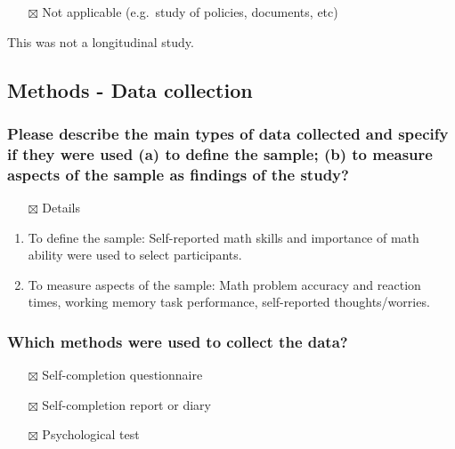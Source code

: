 \documentclass[
  doc, a4paper]{apa7}
\providecommand{\tightlist}{%
  \setlength{\itemsep}{0pt}\setlength{\parskip}{0pt}}
\begin{document}
\begin{itemize}
\tightlist
\item[$\boxtimes$]
  Not applicable (e.g.~study of policies, documents, etc)
\end{itemize}

This was not a longitudinal study.

\subsection{Methods - Data collection}\label{methods---data-collection}

\subsubsection{Please describe the main types of data collected and specify if they were used (a) to define the sample; (b) to measure aspects of the sample as findings of the study?}\label{please-describe-the-main-types-of-data-collected-and-specify-if-they-were-used-a-to-define-the-sample-b-to-measure-aspects-of-the-sample-as-findings-of-the-study}

\begin{itemize}
\tightlist
\item[$\boxtimes$]
  Details
\end{itemize}

\begin{enumerate}
\def\labelenumi{(\alph{enumi})}
\item
  To define the sample: Self-reported math skills and importance of math ability were used to select participants.
\item
  To measure aspects of the sample: Math problem accuracy and reaction times, working memory task performance, self-reported thoughts/worries.
\end{enumerate}

\subsubsection{Which methods were used to collect the data?}\label{which-methods-were-used-to-collect-the-data}

\begin{itemize}
\tightlist
\item[$\boxtimes$]
  Self-completion questionnaire
\item[$\boxtimes$]
  Self-completion report or diary
\item[$\boxtimes$]
  Psychological test
\end{itemize}
\end{document}
